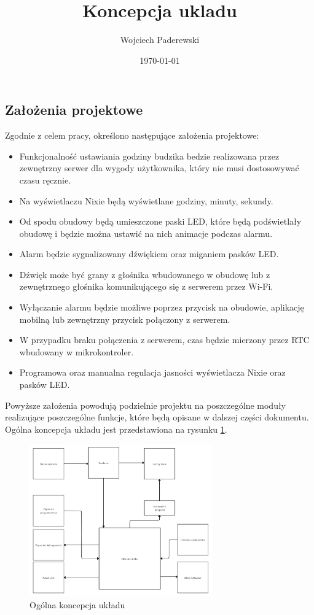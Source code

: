 \documentclass[../main.tex]{subfiles}
\author{Wojciech Paderewski}
\date{\today}
\title{Koncepcja ukladu}
\begin{document}
\subsection{Założenia projektowe}
Zgodnie z celem pracy, określono następujące założenia projektowe:
\begin{itemize}
    \item Funkcjonalność ustawiania godziny budzika bedzie realizowana przez zewnętrzny serwer dla wygody użytkownika, który nie musi dostosowywać czasu ręcznie.
    \item Na wyświetlaczu Nixie będą wyświetlane godziny, minuty, sekundy.
    \item Od spodu obudowy będą umieszczone paski LED, które będą podświetlały obudowę i będzie można ustawić na nich animacje podczas alarmu.
    \item Alarm będzie sygnalizowany dźwiękiem oraz miganiem pasków LED.
    \item Dźwięk może być grany z głośnika wbudowanego w obudowę lub z zewnętrznego głośnika komunikującego się z serwerem przez Wi-Fi.
    \item Wyłączanie alarmu będzie możliwe poprzez przycisk na obudowie, aplikację mobilną lub zewnętrzny przycisk połączony z serwerem.
    \item W przypadku braku połączenia z serwerem, czas będzie mierzony przez RTC wbudowany w mikrokontroler.
    \item Programowa oraz manualna regulacja jasności wyświetlacza Nixie oraz pasków LED.
\end{itemize}
Powyższe założenia powodują podzielnie projektu na poszczególne moduły realizujące poszczególne funkcje, które będą opisane w dalszej części dokumentu.
Ogólna koncepcja układu jest przedstawiona na rysunku \ref{fig:concept}.
\begin{figure}[H]
    \centering
    \includegraphics[width=0.7\textwidth]{Nixie-concept.png}
    \caption{Ogólna koncepcja układu}
    \label{fig:concept}
\end{figure}
\end{document}
